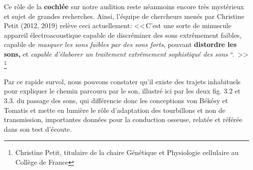  Ce rôle de la \textbf{cochlée} sur notre audition reste néanmoins encore très mystérieux
 et sujet de grandes recherches. Ainsi, l'équipe de chercheurs menés par Christine Petit (2012, 
 2019) relève ceci
actuellement:
<<\,C'est une sorte de minuscule appareil électroacoustique capable
de discréminer des sons extrêmement faibles, capable de \emph{masquer
les sons faibles par des sons forts}, pouvant \textbf{distordre les
sons,} et \emph{capable d'élaborer un traitement extrêmement
sophistiqué des sons} ``. \,>> \autocite{petit_lookscience}   \footnote{Christine Petit, titulaire de la chaire Génétique et
Physiologie cellulaire au Collège de France}

Par ce rapide survol, nous pouvons constater qu'il existe  des trajets inhabituels  pour expliquer le 
chemin 
parcouru par 
le son, illustré ici par  les deux fig. 3.2 et 3.3.  du passage des sons,  qui différencie donc  les 
conceptions von Békésy et 
Tomatis et mette en lumière  le rôle d'adaptation des tourbillons et non de transmission, 
importantes données pour 
la conduction osseuse, relatée et référée dans son test d'écoute.





